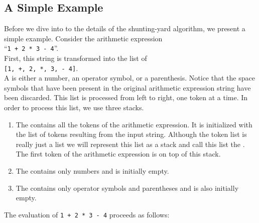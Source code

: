 \subsection{A Simple Example}
Before we dive into to the details of the shunting-yard algorithm, we present a
simple example.  Consider the arithmetic expression 
\\[0.2cm]
\hspace*{1.3cm} 
``\texttt{1 + 2 * 3 - 4}''. 
\\[0.2cm]
First, this string is transformed into the list of 
\\[0.2cm]
\hspace*{1.3cm}
\texttt{[1, +, 2, *, 3, - 4]}.
\\[0.2cm]
A  is either a number, an operator symbol, or a parenthesis.
Notice that the space symbols that have been present in the original arithmetic expression string
have been discarded.  This list is processed from left to right, one token
 at a time.  In order to process this list, we use three stacks.
\begin{enumerate}
\item The   contains all the tokens of the arithmetic expression.  It is
      initialized with the list of tokens resulting from the input string.
      Although the token list is really just a list we will represent this list as a stack and call
      this list the .
      The first token of the arithmetic expression is on top of this stack.
\item The   contains only numbers and is initially empty.
\item The  contains only operator symbols and parentheses and is also initially
      empty.
\end{enumerate}
The evaluation of \texttt{1 + 2 * 3 - 4} proceeds as follows:
